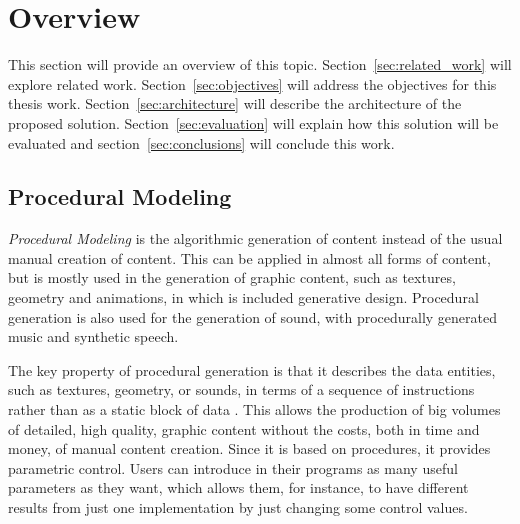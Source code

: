 
% 
% 

\section{Overview} %
\label{sec:overview}


This section will provide an overview of this topic.  Section~\ref{sec:related_work} will explore related work. Section~\ref{sec:objectives} will address the objectives for this thesis work. Section~\ref{sec:architecture} will describe the architecture of the proposed solution. Section~\ref{sec:evaluation} will explain how this solution will be evaluated and section~\ref{sec:conclusions} will conclude this work.

\subsection{Procedural Modeling} %
\label{sub:procedural_modeling}

\emph{Procedural Modeling} is the algorithmic generation of content instead of the usual manual creation of content. This can be applied in almost all forms of content, but is mostly used in the generation of graphic content, such as textures, geometry and animations, in which is included generative design. Procedural generation is also used for the generation of sound, with procedurally generated music and synthetic speech.

The key property of procedural generation is that it describes the data entities, such as textures, geometry, or sounds, in terms of a sequence of instructions rather than as a static block of data \cite{Kelly}. This allows the production of big volumes of detailed, high quality, graphic content without the costs, both in time and money, of manual content creation. Since it is based on procedures, it provides parametric control. Users can introduce in their programs as many useful parameters as they want, which allows them, for instance, to have different results from just one implementation by just changing some control values.